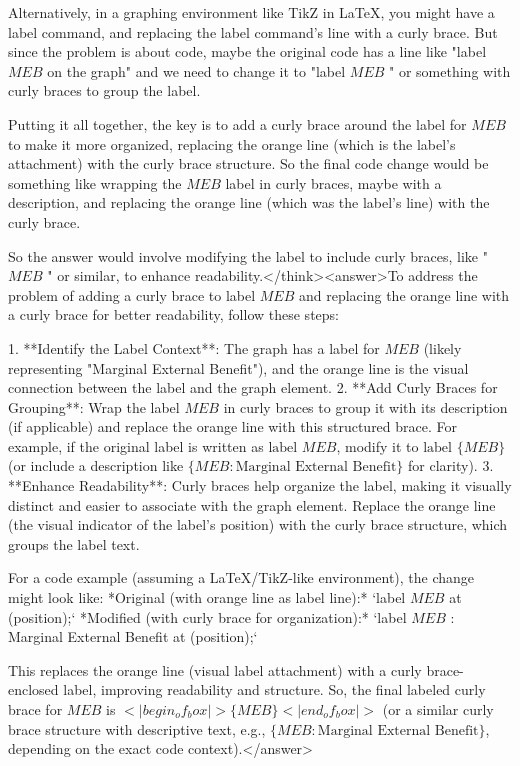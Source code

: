 Alternatively, in a graphing environment like TikZ in LaTeX, you might have a label command, and replacing the label command's line with a curly brace. But since the problem is about code, maybe the original code has a line like "label $MEB$ on the graph" and we need to change it to "label { $MEB$ }" or something with curly braces to group the label.

Putting it all together, the key is to add a curly brace around the label for $MEB$ to make it more organized, replacing the orange line (which is the label's attachment) with the curly brace structure. So the final code change would be something like wrapping the $MEB$ label in curly braces, maybe with a description, and replacing the orange line (which was the label's line) with the curly brace.

So the answer would involve modifying the label to include curly braces, like "{ $MEB$ }" or similar, to enhance readability.</think><answer>To address the problem of adding a curly brace to label \( MEB \) and replacing the orange line with a curly brace for better readability, follow these steps:  

1. **Identify the Label Context**: The graph has a label for \( MEB \) (likely representing "Marginal External Benefit"), and the orange line is the visual connection between the label and the graph element.  
2. **Add Curly Braces for Grouping**: Wrap the label \( MEB \) in curly braces to group it with its description (if applicable) and replace the orange line with this structured brace. For example, if the original label is written as \( \text{label } MEB \), modify it to \( \text{label } \{ MEB \} \) (or include a description like \( \{ MEB : \text{Marginal External Benefit} \} \) for clarity).  
3. **Enhance Readability**: Curly braces help organize the label, making it visually distinct and easier to associate with the graph element. Replace the orange line (the visual indicator of the label’s position) with the curly brace structure, which groups the label text.  

For a code example (assuming a LaTeX/TikZ-like environment), the change might look like:  
*Original (with orange line as label line):*  
`label $MEB$ at (position);`  
*Modified (with curly brace for organization):*  
`label { $MEB$ : Marginal External Benefit } at (position);`  

This replaces the orange line (visual label attachment) with a curly brace-enclosed label, improving readability and structure.  
So, the final labeled curly brace for \( MEB \) is \( <|begin_of_box|>\{ MEB \}<|end_of_box|> \) (or a similar curly brace structure with descriptive text, e.g., \( \{ MEB : \text{Marginal External Benefit} \} \), depending on the exact code context).</answer>
